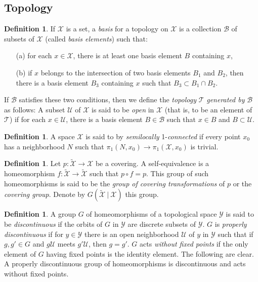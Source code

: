\documentclass[10]{article}
\theoremstyle{plain}
\theoremstyle{definition}
\newtheorem{defn}[prop]{Definition}%
\theoremstyle{definition}
\newtheorem{definition}[prop]{Definition}
\numberwithin{equation}{section}
\newcommand{\7}{\dagger}                     %
\newcommand{\8}{\bullet}                     %
\renewcommand{\.}{\cdot}                     %
\renewcommand{\:}{\colon}                    %
\newcommand{\sU}{\mathcal{U}}       %
\newcommand{\sX}{\mathcal{X}}       %
\newcommand{\sY}{\mathcal{Y}}       %
\renewcommand{\:}{\colon}           %
\begin{document}
	\begin{appendices}
	\section{Topology}
		\begin{definition}\label{top_base_defn}\cite{munkres:topology}
		If $\sX$ is a set, a \textit{basis} for a topology on $\sX$ is a collection $\mathscr B$ of subsets of $\sX$
		(called \textit{basis elements}) such that:
		\begin{enumerate}
			\item [(a)]  for each $x\in \sX$, there is at least one basis element $B$ containing $x$,
			\item [(b)]  if $x$ belongs to the intersection of two basis elements $B_1$ and $B_2$, then there is a
			basis element $B_3$ containing $x$ such that $B_3 \subset B_1\cap B_2$.
		\end{enumerate}
		
		If  $\mathscr B$ satisfies these two conditions, then we define the \textit{topology}  $\mathscr T$ \textit{generated by}  $\mathscr B$ as
		follows: A subset $\sU$ of $\sX$ is said to be \textit{open} in $\sX$ (that is, to be an element of $\mathscr T$) if for
		each $x \in \sU$, there is a basis element $B \in \mathscr B$ such that $x \in B$ and $B \subset \sU$.
	\end{definition}
	
	\begin{defn}\label{top_semi1_defn}\cite{spanier:at}
	A space $\sX$ is said to by \textit{semilocally} 1-\textit{connected} if every point $x_0$ has a neighborhood $N$ such that $\pi_1\left( N, x_0\right) \to \pi_1\left(\sX, x_0 \right)$ is trivial. 
\end{defn} 

	\begin{defn}\label{top_covering_transformations_group_defn}\cite{spanier:at}
		Let $p: \mathcal{\widetilde{X}} \to \mathcal{X}$ be a covering.  A self-equivalence is a homeomorphism $f:\mathcal{\widetilde{X}}\to\mathcal{\widetilde{X}}$ such that $p \circ f = p$. This group of such homeomorphisms is said to be the {\it group of covering transformations} of $p$ or the {\it covering group}. Denote by $G\left( \mathcal{\widetilde{X}}~|~\mathcal{X}\right)$ this group.
	\end{defn}
	
	\begin{definition}\label{top_properly_disc_defn}\cite{spanier:at}
		A group $G$ of homeomorphisms of a topological space $\sY$ is said to be  
		\textit{discontinuous} if the orbits of $G$ in $\sY$ are discrete subsets of $\sY$. $G$ is \textit{properly 
			discontinuous} if for $y \in \sY$ there is an open neighborhood $\sU$ of $y$ in $\sY$ such 
		that if $g, g' \in  G$ and $g\sU$ meets $g'\sU$, then $g = g'$. $G$ acts \textit{ without fixed points} 
		if the only element of $G$ having fixed points is the identity element. The 
		following are clear. 
		A properly discontinuous group of homeomorphisms is discontinuous 
		and acts without fixed points. 
	\end{definition}
	

\end{appendices}
\end{document}
